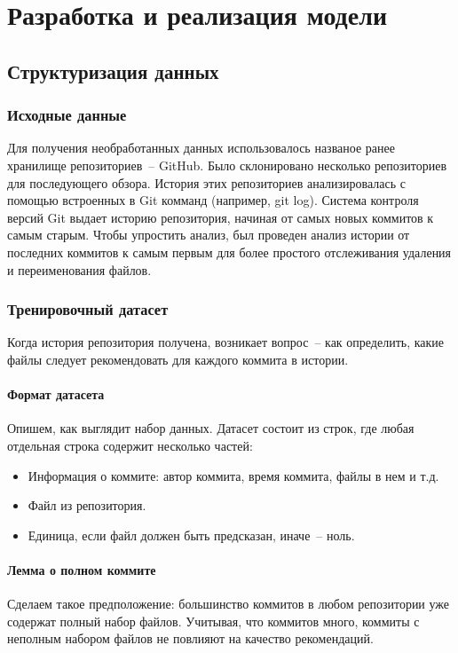 \documentclass[times]{itmo-student-thesis}
\begin{document}
\chapter{Разработка и реализация модели}
\section{Структуризация данных}
\subsection{Исходные данные}
Для получения необработанных данных использовалось названое ранее хранилище репозиториев~-- GitHub. Было склонировано несколько репозиториев для последующего обзора. История этих репозиториев анализировалась с помощью встроенных в Git комманд (например, git log). Система контроля версий Git выдает историю репозитория, начиная от самых новых коммитов к самым старым. Чтобы упростить анализ, был проведен анализ истории от последних коммитов к самым первым для более простого отслеживания удаления и переименования файлов.
\subsection{Тренировочный датасет}
Когда история репозитория получена, возникает вопрос~-- как определить, какие файлы следует рекомендовать для каждого коммита в истории.
\subsubsection{Формат датасета}
Опишем, как выглядит набор данных. Датасет состоит из строк, где любая отдельная строка содержит несколько частей:
    \begin{itemize}
		\item Информация о коммите: автор коммита, время коммита, файлы в нем и т.д.
		\item Файл из репозитория.
		\item Единица, если файл должен быть предсказан, иначе~-- ноль.
	\end{itemize}
\subsubsection{Лемма о полном коммите}
Сделаем такое предположение: большинство коммитов в любом репозитории уже содержат полный набор файлов. Учитывая, что коммитов много, коммиты с неполным набором файлов не повлияют на качество рекомендаций.
\end{document}
